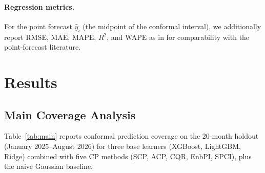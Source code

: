 \documentclass[preprint,12pt]{elsarticle}
\begin{document}
\begin{enumerate}
\paragraph{Regression metrics.} For the point forecast $\hat{y}_i$ (the midpoint of the conformal interval), we additionally report RMSE, MAE, MAPE, $R^2$, and WAPE as in \citet{lago2021} for comparability with the point-forecast literature.

\section{Results}\label{sec:results}

\subsection{Main Coverage Analysis}\label{sec:benchmark}

Table~\ref{tab:main} reports conformal prediction coverage on the 20-month holdout (January 2025--August 2026) for three base learners (XGBoost, LightGBM, Ridge) combined with five CP methods (SCP, ACP, CQR, EnbPI, SPCI), plus the naive Gaussian baseline.


\end{enumerate}
\end{document}
